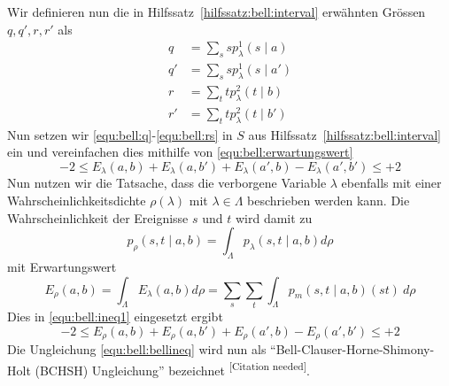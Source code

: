 \begin{refsection}
Wir definieren nun die in Hilfssatz~\ref{hilfssatz:bell:interval} erw\"ahnten
Gr\"ossen $q,q',r,r'$ als
\begin{align}
    q  &= \sum_s s p_{\lambda}^1 (s \mid a)  \label{equ:bell:q}\\
    q' &= \sum_s s p_{\lambda}^1 (s \mid a') \\
    r  &= \sum_t t p_{\lambda}^2 (t \mid b)  \\
    r' &= \sum_t t p_{\lambda}^2 (t \mid b') \label{equ:bell:rs}
\end{align}
Nun setzen wir \eqref{equ:bell:q}-\eqref{equ:bell:rs} in $S$ aus 
Hilfssatz~\ref{hilfssatz:bell:interval} ein und vereinfachen dies mithilfe von
\eqref{equ:bell:erwartungswert}
\begin{equation}
    -2 \leq E_{\lambda}(a,b) + E_{\lambda}(a,b') + E_{\lambda}(a',b) - E_{\lambda}(a',b') \leq +2
    \label{equ:bell:ineq1}
\end{equation}
Nun nutzen wir die Tatsache, dass die verborgene Variable $\lambda$ ebenfalls
mit einer Wahrscheinlichkeitsdichte $\rho(\lambda)$ mit 
$\lambda \in \Lambda$ beschrieben werden kann.
Die Wahrscheinlichkeit der Ereignisse $s$ und $t$ wird damit zu
\begin{equation}
    p_{\rho}(s,t  \mid a,b) = \int_{\Lambda} p_{\lambda}(s,t \mid a,b) d\rho
\end{equation}
mit Erwartungswert
\begin{equation}
    E_{\rho}(a,b) = \int_{\Lambda} E_{\lambda}(a,b) d\rho 
    = \sum_s \sum_t \int_{\Lambda} p_m(s,t \mid a,b) (st) \:d\rho
    \label{equ:bell:ew}
\end{equation}
Dies in \eqref{equ:bell:ineq1} eingesetzt ergibt
\begin{equation}
    -2 \leq E_{\rho}(a,b) + E_{\rho}(a,b') + E_{\rho}(a',b) - E_{\rho}(a',b') \leq +2
    \label{equ:bell:bellineq}
\end{equation}
Die Ungleichung \eqref{equ:bell:bellineq} wird nun als
\enquote{Bell-Clauser-Horne-Shimony-Holt (BCHSH) Ungleichung} bezeichnet
\textsuperscript{[Citation needed]}.


\end{refsection}

